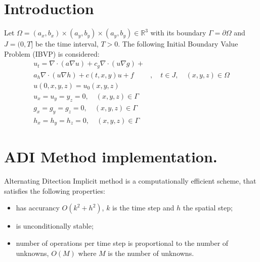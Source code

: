 \documentclass[12pt]{article}
\begin{document}
\section{Introduction}
Let $\Omega=(a_x, b_x)\times(a_y, b_y) \times (a_y, b_y) \in
\mathbb{R}^3$ with its boundary $\Gamma=\partial \Omega$ and
$J=(0,T]$ be the time interval, $T>0$. The following Initial Boundary
Value Problem (IBVP) is considered:
\begin{eqnarray}
u_t= \nabla\cdot(a\nabla u) + c_g\nabla\cdot(u \nabla g) +  \nonumber \\
a_h\nabla\cdot(u \nabla h) +c(t, x, y) u + f&, \quad t\in J, \quad 
(x,y,z)\in \Omega \label{eq:heat}\\
u(0,x,y,z) = u_0(x,y,z)\\
u_x=u_y=y_z = 0, \quad (x,y,z) \in \Gamma \\ 
g_x=g_y=g_z = 0, \quad (x,y,z) \in\Gamma \\
h_x=h_y=h_z = 0, \quad (x,y,z) \in\Gamma 
\end{eqnarray}


\section{ADI Method implementation.}
Alternating Ditection Implicit method is a computationally efficient
scheme, that satisfies the
  following properties:
  \begin{itemize}
\item has accurancy $O(k^2 + h^2)$, $k$ is the time step and $h$ the
spatial step;
    \item is unconditionally stable;
\item number of operations per time step is proportional to the number
of unknowns, $O(M)$
     where $M$ is the number of unknowns.       
  \end{itemize}
\end{document}
